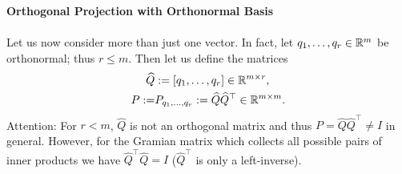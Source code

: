 \begin{frame}
\textbf{Orthogonal Projection with Orthonormal Basis}\\~\\
Let us now consider more than just one vector. In fact, let $q_1,\ldots, q_r \in {\mathbb{R}}^{m}$ be orthonormal; thus $r \leq m$. Then let us define the matrices
\begin{align*}
 \widehat{Q} &:= [q_1,\ldots, q_r] \in {\mathbb{R}}^{m \times r},\\
 P:=&P_{q_1,\ldots, q_r } := \widehat{Q}\widehat{Q}^\top  \in {\mathbb{R}}^{m\times m}.
\end{align*}
Attention: For $r < m$, $\widehat{Q}$ is not an orthogonal matrix and thus $ P = \widehat{Q}\widehat{Q}^\top \neq I$ in general. However, for the Gramian matrix which collects all possible pairs of inner products we have $ \widehat{Q}^\top\widehat{Q} = I$ ($\widehat{Q}^\top$ is only a left-inverse).\\~\\
\end{frame}

